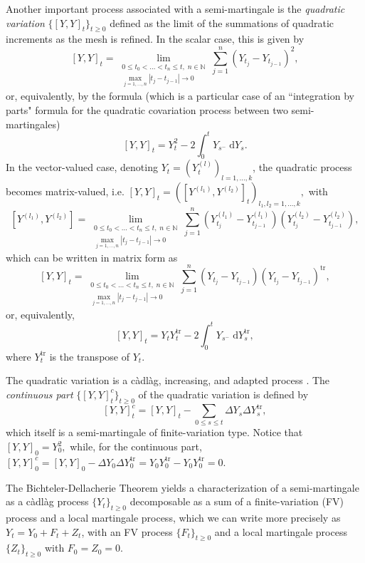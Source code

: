 \documentclass[reqno,12pt]{amsart}
\theoremstyle{plain} %
\theoremstyle{definition} %
\newcommand{\tr}{{\operatorname{tr}}}
\begin{document}
Another important process associated with a semi-martingale is the \emph{quadratic variation} $\{[Y, Y]_t\}_{t\geq 0}$ defined as the limit of the summations of quadratic increments as the mesh is refined. In the scalar case, this is given by
\[
    [Y, Y]_t = \lim_{\substack{0\leq t_0 < \ldots < t_n \leq t, \;n\in \mathbb{N} \\ \max_{j=1, \ldots, n}|t_j - t_{j-1}| \rightarrow 0}} \sum_{j=1}^n (Y_{t_j} - Y_{t_{j-1}})^2,
\]
or, equivalently, by the formula (which is a particular case of an ``integration by parts" formula for the quadratic covariation process between two semi-martingales)
\[
    [Y, Y]_t = Y_t^2 - 2\int_0^t Y_{s^-} \;\mathrm{d}Y_s.
\]
In the vector-valued case, denoting $Y_t = (Y_t^{(l)})_{l=1, \ldots, k}$, the quadratic process becomes matrix-valued, i.e. $[Y, Y]_t = ([Y^{(l_1)}, Y^{(l_2)}]_t)_{l_1,l_2=1,\ldots, k},$ with
\[
    [Y^{(l_1)}, Y^{(l_2)}] = \lim_{\substack{0\leq t_0 < \ldots < t_n \leq t, \;n\in \mathbb{N} \\ \max_{j=1, \ldots, n}|t_j - t_{j-1}| \rightarrow 0}} \sum_{j=1}^n (Y_{t_j}^{(l_1)} - Y_{t_{j-1}}^{(l_1)}) (Y_{t_j}^{(l_2)} - Y_{t_{j-1}}^{(l_2)}),
\]
which can be written in matrix form as
\[ [Y, Y]_t = \lim_{\substack{0\leq t_0 < \ldots < t_n \leq t, \;n\in \mathbb{N} \\ \max_{j=1, \ldots, n}|t_j - t_{j-1}| \rightarrow 0}} \sum_{j=1}^n (Y_{t_j} - Y_{t_{j-1}})(Y_{t_j} - Y_{t_{j-1}})^\tr,
\]
or, equivalently,
\[
    [Y, Y]_t = Y_tY_t^\tr - 2\int_0^t Y_{s^-} \;\mathrm{d}Y_s^\tr,
\]
where $Y_t^\tr$ is the transpose of $Y_t.$

The quadratic variation is a c\`adl\`ag, increasing, and adapted process \cite[Theorem II.22]{Protter2005}. The \emph{continuous part} $\{[Y, Y]_t^c\}_{t\geq 0}$ of the quadratic variation is defined by
\[
    [Y, Y]_t^c = [Y, Y]_t - \sum_{0\leq s \leq t} \Delta Y_s\Delta Y_s^\tr,
\]
which itself is a semi-martingale of finite-variation type. Notice that $[Y, Y]_0 = Y_0^2,$ while, for the continuous part, $[Y, Y]_0^c = [Y, Y]_0 - \Delta Y_0\Delta Y_0^\tr = Y_0 Y_0^\tr - Y_0 Y_0^\tr = 0.$

The Bichteler-Dellacherie Theorem \cite[Theorem III.47]{Protter2005} yields a characterization of a semi-martingale as a c\`adl\`ag process $\{Y_t\}_{t\geq 0}$ decomposable as a sum of a finite-variation (FV) process and a local martingale process, which we can write more precisely as $Y_t = Y_0 + F_t + Z_t$, with an FV process $\{F_t\}_{t\geq 0}$ and a local martingale process $\{Z_t\}_{t\geq 0}$ with $F_0 = Z_0 = 0.$
\end{document}
